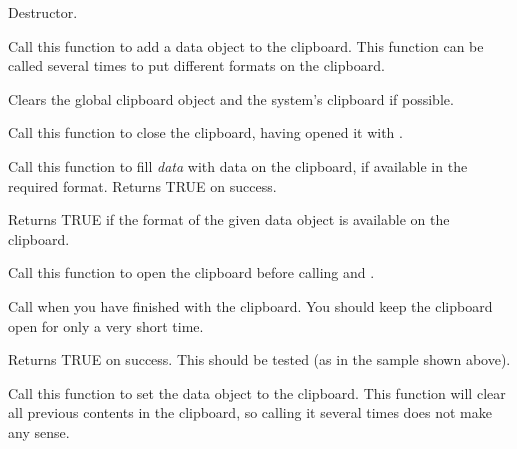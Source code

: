
Destructor.

\label{wxclipboardadddata}


Call this function to add a data object to the clipboard. This function can be called several times
to put different formats on the clipboard.

\label{wxclipboardclear}


Clears the global clipboard object and the system's clipboard if possible.

\label{wxclipboardclose}


Call this function to close the clipboard, having opened it with .

\label{wxclipboardgetdata}


Call this function to fill {\it data} with data on the clipboard, if available in the required
format. Returns TRUE on success.

\label{wxclipboardissupported}


Returns TRUE if the format of the given data object is available on the clipboard.

\label{wxclipboardopen}


Call this function to open the clipboard before calling  
and .

Call  when you have finished with the clipboard. You
should keep the clipboard open for only a very short time.

Returns TRUE on success. This should be tested (as in the sample shown above).

\label{wxclipboardsetdata}


Call this function to set the data object to the clipboard. This function will
clear all previous contents in the clipboard, so calling it several times
does not make any sense.

